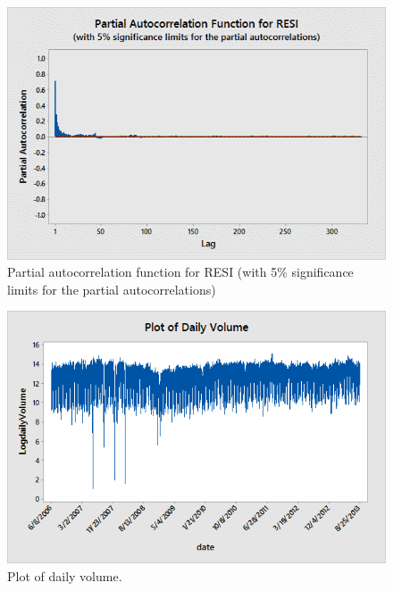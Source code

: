         \begin{figure}[!ht]
        \centering
        \includegraphics[width=\textwidth]{chapters/chapter_stat_ts/figures/resi.png}
        \caption{Partial autocorrelation function for RESI (with 5\% significance limits for the partial autocorrelations) \label{fig:partresi}}
        \end{figure}
        
        \begin{figure}[!ht]
        \centering
        \includegraphics[width=\textwidth]{chapters/chapter_stat_ts/figures/dailyvol.png}
        \caption{Plot of daily volume. \label{fig:dailyvol}}
        \end{figure}


